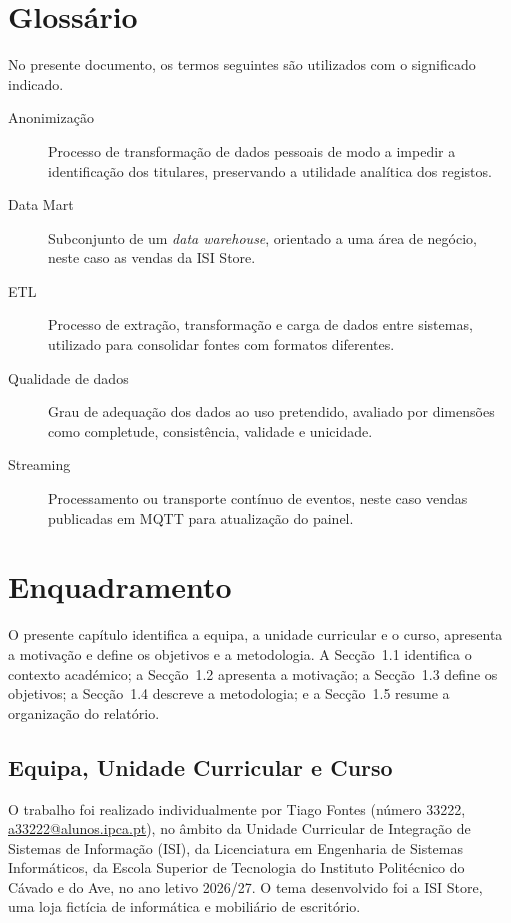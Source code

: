 \documentclass[11pt,a4paper]{article}
\begin{document}
\section*{Glossário}
No presente documento, os termos seguintes são utilizados com o significado indicado.
\begin{description}
\item[Anonimização] Processo de transformação de dados pessoais de modo a impedir a identificação dos titulares, preservando a utilidade analítica dos registos.
\item[Data Mart] Subconjunto de um \textit{data warehouse}, orientado a uma área de negócio, neste caso as vendas da ISI Store.
\item[ETL] Processo de extração, transformação e carga de dados entre sistemas, utilizado para consolidar fontes com formatos diferentes.
\item[Qualidade de dados] Grau de adequação dos dados ao uso pretendido, avaliado por dimensões como completude, consistência, validade e unicidade.
\item[Streaming] Processamento ou transporte contínuo de eventos, neste caso vendas publicadas em MQTT para atualização do painel.
\end{description}

\clearpage

\tableofcontents
\clearpage
\listoffigures
\clearpage
\listoftables
\clearpage
\lstlistoflistings

\section{Enquadramento}
O presente capítulo identifica a equipa, a unidade curricular e o curso, apresenta a motivação e define os objetivos e a metodologia. A Secção~1.1 identifica o contexto académico; a Secção~1.2 apresenta a motivação; a Secção~1.3 define os objetivos; a Secção~1.4 descreve a metodologia; e a Secção~1.5 resume a organização do relatório.

\subsection{Equipa, Unidade Curricular e Curso}
O trabalho foi realizado individualmente por Tiago Fontes (número 33222, \url{a33222@alunos.ipca.pt}), no âmbito da Unidade Curricular de Integração de Sistemas de Informação (ISI), da Licenciatura em Engenharia de Sistemas Informáticos, da Escola Superior de Tecnologia do Instituto Politécnico do Cávado e do Ave, no ano letivo 2026/27. O tema desenvolvido foi a ISI Store, uma loja fictícia de informática e mobiliário de escritório.
\end{document}
